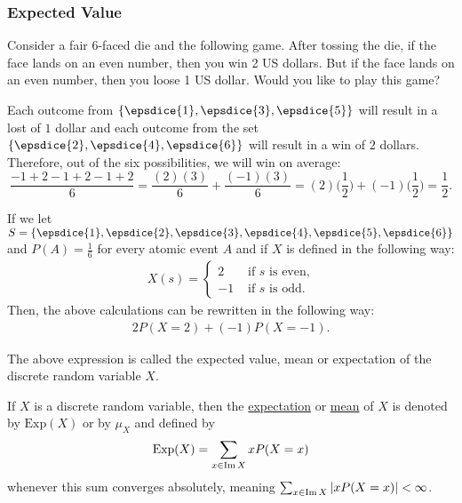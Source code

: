 \subsubsection*{Expected Value}

\begin{example}
Consider a fair $6$-faced die and the following game. After tossing the die, if the face lands on an even number, then you win 2 US dollars. But if the face lands on an even number, then you loose 1 US dollar. Would you like to play this game?
\end{example} 

\begin{sol*}
Each outcome from $\{ \epsdice{1} , \epsdice{3} , \epsdice{5} \}$ will result in a lost of $1$ dollar and each outcome from the set $\{ \epsdice{2} , \epsdice{4} , \epsdice{6} \}$ will result in a win of $2$ dollars. Therefore, out of the six possibilities, we will win on average:
\[
    \frac{-1 + 2 - 1 + 2 - 1 + 2}{6} = \frac{(2) (3)}{6} + \frac{(-1)(3)}{6} = (2) \Big( \frac{1}{2} \Big) + (-1) \Big( \frac{1}{2} \Big) = \frac{1}{2} .
\]

If we let $S = \{ \epsdice{1} , \epsdice{2} , \epsdice{3} , \epsdice{4} , \epsdice{5} , \epsdice{6} \}$ and $P (A) = \frac{1}{6}$ for every atomic event $A$ and if $X$ is defined in the following way: 
    \begin{align*}
    X(s) = \left\{ \begin{matrix} 
    2 & \text{ if } s \text{ is even,} \\
    -1 & \text{ if } s \text{ is odd.}
    \end{matrix} \right.
    \end{align*}
Then, the above calculations can be rewritten in the following way:
    \begin{align*}
    2 P (X = 2) + (-1) P (X= -1) . \tag*{$\triangle$}
    \end{align*} 
\end{sol*}

The above expression is called the expected value, mean or expectation of the discrete random variable $X$.

\begin{definition}\label{D:ExpectationDiscreteRandomVariable}
If $X$ is a discrete random variable, then the \underline{expectation} or \underline{mean} of $X$ is denoted by $\mathrm{Exp} (X)$ or by $\mu_X$ and defined by
    \begin{align*}
    \mathrm{Exp} (X) = \sum_{x \in \operatorname{Im} X} x P (X = x)
    \end{align*} 
whenever this sum converges absolutely, meaning $\sum_{x \in \operatorname{Im} X} |x P (X = x)| < \infty$.
\end{definition}


